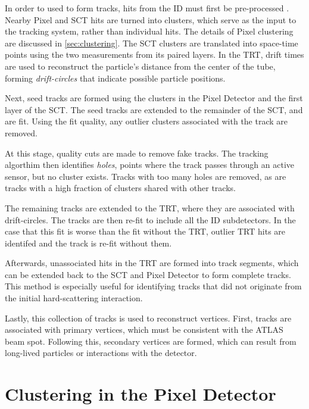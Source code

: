 In order to used to form tracks, hits from the \ac{ID} must first be pre-processed \cite{ATL-PHYS-PUB-2009-002}. Nearby Pixel and \ac{SCT} hits are turned into clusters, which serve as the input to the tracking system, rather than individual hits. The details of Pixel clustering are discussed in \autoref{sec:clustering}. The \ac{SCT} clusters are translated into space-time points using the two measurements from its paired layers. In the \ac{TRT}, drift times are used to reconstruct the particle's distance from the center of the tube, forming \textit{drift-circles} that indicate possible particle positions. 

Next, seed tracks are formed using the clusters in the Pixel Detector and the first layer of the \ac{SCT}. The seed tracks are extended to the remainder of the \ac{SCT}, and are fit. Using the fit quality, any outlier clusters associated with the track are removed. 

At this stage, quality cuts are made to remove fake tracks. The tracking algorthim then identifies \textit{holes}, points where the track passes through an active sensor, but no cluster exists. Tracks with too many holes are removed, as are tracks with a high fraction of clusters shared with other tracks. 

The remaining tracks are extended to the \ac{TRT}, where they are associated with drift-circles. The tracks are then re-fit to include all the \ac{ID} subdetectors. In the case that this fit is worse than the fit without the \ac{TRT}, outlier \ac{TRT} hits are identifed and the track is re-fit without them. 

Afterwards, unassociated hits in the \ac{TRT} are formed into track segments, which can be extended back to the \ac{SCT} and Pixel Detector to form complete tracks. This method is especially useful for identifying tracks that did not originate from the initial hard-scattering interaction.

Lastly, this collection of tracks is used to reconstruct vertices. First, tracks are associated with primary vertices, which must be consistent with the \ac{ATLAS} beam spot. Following this, secondary vertices are formed, which can result from long-lived particles or interactions with the detector.

\section{Clustering in the Pixel Detector}
\label{sec:clustering}

